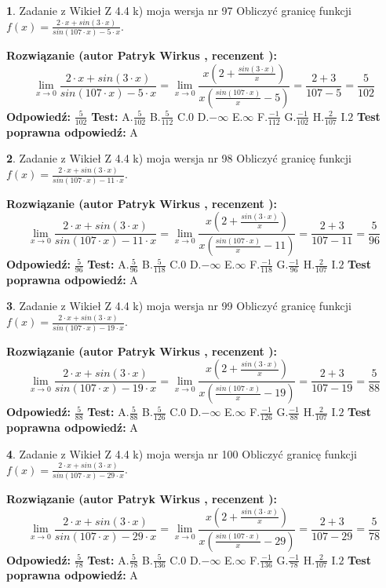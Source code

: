 \documentclass[12pt, a4paper]{article}
\theoremstyle{definition} %
\newtheorem{zad}{}
\newcommand{\zadStart}[1]{\begin{zad}#1\newline}
\newcommand{\zadStop}{\end{zad}}
\newcommand{\rozwStart}[2]{\noindent \textbf{Rozwiązanie (autor #1 , recenzent #2): }\newline}
\newcommand{\rozwStop}{\newline}
\newcommand{\odpStart}{\noindent \textbf{Odpowiedź:}\newline}
\newcommand{\odpStop}{\newline}
\newcommand{\testStart}{\noindent \textbf{Test:}\newline}
\newcommand{\testStop}{\newline}
\newcommand{\kluczStart}{\noindent \textbf{Test poprawna odpowiedź:}\newline}
\newcommand{\kluczStop}{\newline}
\begin{document}
\zadStart{Zadanie z Wikieł Z 4.4 k) moja wersja nr 97}
Obliczyć granicę funkcji $f(x)=\frac{2\cdot x +sin(3\cdot x)}{sin(107\cdot x) -5\cdot x}$.
\zadStop
\rozwStart{Patryk Wirkus}{}
$$\lim\limits_{x\to 0}\frac{2\cdot x +sin(3\cdot x)}{sin(107\cdot x) -5\cdot x}
=\lim\limits_{x\to 0}\frac{x(2+\frac{sin(3\cdot x)}{x})}{x(\frac{sin(107\cdot x)}{x}-5)}
=\frac{2+3}{107-5} = \frac{5}{102}$$
\rozwStop
\odpStart
$\frac{5}{102}$
\odpStop
\testStart
A.$\frac{5}{102}$
B.$\frac{5}{112}$
C.$0$
D.$-\infty$
E.$\infty$
F.$\frac{-1}{112}$
G.$\frac{-1}{102}$
H.$\frac{2}{107}$
I.$2$
\testStop
\kluczStart
A
\kluczStop



\zadStart{Zadanie z Wikieł Z 4.4 k) moja wersja nr 98}
Obliczyć granicę funkcji $f(x)=\frac{2\cdot x +sin(3\cdot x)}{sin(107\cdot x) -11\cdot x}$.
\zadStop
\rozwStart{Patryk Wirkus}{}
$$\lim\limits_{x\to 0}\frac{2\cdot x +sin(3\cdot x)}{sin(107\cdot x) -11\cdot x}
=\lim\limits_{x\to 0}\frac{x(2+\frac{sin(3\cdot x)}{x})}{x(\frac{sin(107\cdot x)}{x}-11)}
=\frac{2+3}{107-11} = \frac{5}{96}$$
\rozwStop
\odpStart
$\frac{5}{96}$
\odpStop
\testStart
A.$\frac{5}{96}$
B.$\frac{5}{118}$
C.$0$
D.$-\infty$
E.$\infty$
F.$\frac{-1}{118}$
G.$\frac{-1}{96}$
H.$\frac{2}{107}$
I.$2$
\testStop
\kluczStart
A
\kluczStop



\zadStart{Zadanie z Wikieł Z 4.4 k) moja wersja nr 99}
Obliczyć granicę funkcji $f(x)=\frac{2\cdot x +sin(3\cdot x)}{sin(107\cdot x) -19\cdot x}$.
\zadStop
\rozwStart{Patryk Wirkus}{}
$$\lim\limits_{x\to 0}\frac{2\cdot x +sin(3\cdot x)}{sin(107\cdot x) -19\cdot x}
=\lim\limits_{x\to 0}\frac{x(2+\frac{sin(3\cdot x)}{x})}{x(\frac{sin(107\cdot x)}{x}-19)}
=\frac{2+3}{107-19} = \frac{5}{88}$$
\rozwStop
\odpStart
$\frac{5}{88}$
\odpStop
\testStart
A.$\frac{5}{88}$
B.$\frac{5}{126}$
C.$0$
D.$-\infty$
E.$\infty$
F.$\frac{-1}{126}$
G.$\frac{-1}{88}$
H.$\frac{2}{107}$
I.$2$
\testStop
\kluczStart
A
\kluczStop



\zadStart{Zadanie z Wikieł Z 4.4 k) moja wersja nr 100}
Obliczyć granicę funkcji $f(x)=\frac{2\cdot x +sin(3\cdot x)}{sin(107\cdot x) -29\cdot x}$.
\zadStop
\rozwStart{Patryk Wirkus}{}
$$\lim\limits_{x\to 0}\frac{2\cdot x +sin(3\cdot x)}{sin(107\cdot x) -29\cdot x}
=\lim\limits_{x\to 0}\frac{x(2+\frac{sin(3\cdot x)}{x})}{x(\frac{sin(107\cdot x)}{x}-29)}
=\frac{2+3}{107-29} = \frac{5}{78}$$
\rozwStop
\odpStart
$\frac{5}{78}$
\odpStop
\testStart
A.$\frac{5}{78}$
B.$\frac{5}{136}$
C.$0$
D.$-\infty$
E.$\infty$
F.$\frac{-1}{136}$
G.$\frac{-1}{78}$
H.$\frac{2}{107}$
I.$2$
\testStop
\kluczStart
A
\kluczStop
\end{document}
